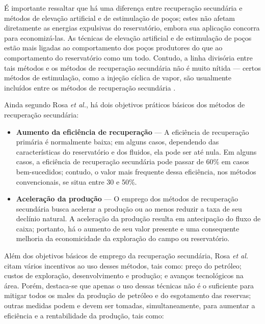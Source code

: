 É importante ressaltar que há uma diferença entre recuperação secundária e métodos de elevação artificial e de estimulação de poços; estes não afetam diretamente as energias expulsivas do reservatório, embora sua aplicação concorra para economizá-las. As técnicas de elevação artificial e de estimulação de poços estão mais ligadas ao comportamento dos poços produtores do que ao comportamento do reservatório como um todo. Contudo, a linha divisória entre tais métodos e os métodos de recuperação secundária não é muito nítida --- certos métodos de estimulação, como a injeção cíclica de vapor, são usualmente incluídos entre os métodos de recuperação secundária \cite{engres}.

Ainda segundo Rosa \textit{et al.}, há dois objetivos práticos básicos dos métodos de recuperação secundária:

\begin{itemize}
\item \textbf{Aumento da eficiência de recuperação} --- A eficiência de recuperação primária é normalmente baixa; em alguns casos, dependendo das características do reservatório e dos fluidos, ela pode ser até nula. Em alguns casos, a eficiência de recuperação secundária pode passar de 60\% em casos bem-sucedidos; contudo, o valor mais frequente dessa eficiência, nos métodos convencionais, se situa entre 30 e 50\%.
\item \textbf{Aceleração da produção} --- O emprego dos métodos de recuperação secundária busca acelerar a produção ou ao menos reduzir a taxa de seu declínio natural. A aceleração da produção resulta em antecipação do fluxo de caixa; portanto, há o aumento de seu valor presente e uma consequente melhoria da economicidade da exploração do campo ou reservatório.
\end{itemize}

Além dos objetivos básicos de emprego da recuperação secundária, Rosa \textit{et al.} citam vários incentivos ao uso desses métodos, tais como: preço do petróleo; custos de exploração, desenvolvimento e produção; e avanços tecnológicos na área. Porém, destaca-se que apenas o uso dessas técnicas não é o suficiente para mitigar todos os males da produção de petróleo e do esgotamento das reservas; outras medidas podem e devem ser tomadas, simultaneamente, para aumentar a eficiência e a rentabilidade da produção, tais como:

